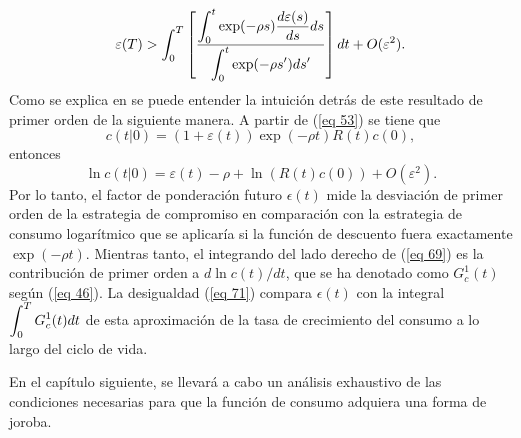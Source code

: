 \begin{equation}
\label{eq 71}
\varepsilon(T)> \displaystyle \int_0^T \left[\dfrac{ \displaystyle \int_0^t\exp ( - \rho s) \dfrac{d\varepsilon(s) }{ds} ds }{\displaystyle \int_0^t \exp(- \rho s') ds'} \right]dt + O(\varepsilon^2) .
\end{equation}
%
\noindent
Como se explica en \parencite{feigenbaum2021deviation}
%
se puede entender la intuición detrás de este resultado de primer orden de la siguiente manera. A partir de (\ref{eq 53}) se tiene que
$$c(t|0)=(1+ \varepsilon(t)) \exp(-\rho t) R(t) c(0),$$
%
\noindent entonces
%
$$\ln c(t|0)= \varepsilon(t) - \rho + \ln (R(t)c(0))+ O(\varepsilon^2).$$
%
\noindent
Por lo tanto, el factor de ponderación futuro $\epsilon(t)$ mide la desviación de primer orden de la estrategia de compromiso en comparación con la estrategia de consumo logarítmico que se aplicaría si la función de descuento fuera exactamente $\exp(-\rho t)$. Mientras tanto, el integrando del lado derecho de (\ref{eq 69}) es la contribución de primer orden a $d\ln c(t)/dt$, que se ha denotado como $G^1_c(t)$ según (\ref{eq 46}). La desigualdad (\ref{eq 71}) compara $\epsilon(t)$ con la integral $\displaystyle \int_0^T G^1_c (t)dt$ de esta aproximación de la tasa de crecimiento del consumo a lo largo del ciclo de vida.

En el capítulo siguiente, se llevará a cabo un análisis exhaustivo de las condiciones necesarias para que la función de consumo adquiera una forma de joroba.
